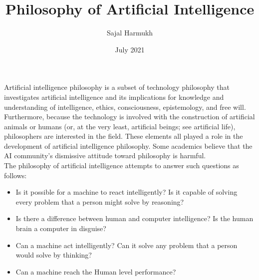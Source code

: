 \documentclass{article}
\title{\vspace{-3cm}Philosophy of Artificial Intelligence}
\author{Sajal Harmukh}
\date{July 2021}
\begin{document}
\maketitle
Artificial intelligence philosophy is a subset of technology philosophy that investigates artificial intelligence and its implications for knowledge and understanding of intelligence, ethics, consciousness, epistemology, and free will. Furthermore, because the technology is involved with the construction of artificial animals or humans (or, at the very least, artificial beings; see artificial life), philosophers are interested in the field. These elements all played a role in the development of artificial intelligence philosophy. Some academics believe that the AI community's dismissive attitude toward philosophy is harmful.\\

The philosophy of artificial intelligence attempts to answer such questions as follows:
\begin{itemize}
	\item Is it possible for a machine to react intelligently? Is it capable of solving every problem that a person might solve by reasoning?

	\item Is there a difference between human and computer intelligence? Is the human brain a computer in disguise?

	\item Can a machine act intelligently? Can it solve any problem that a person would solve by thinking?

	
	\item Can a machine reach the Human level performance?

\end{itemize}
\end{document}
